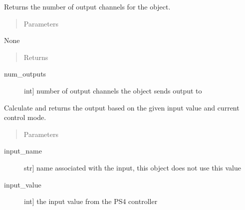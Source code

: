 \documentclass[letterpaper,10pt,english]{sphinxmanual}
\begin{document}
\begin{fulllineitems}
\begin{fulllineitems}
\label{\detokenize{generic:AnalogOutputObject.AnalogOutputObject.get_num_channels}}
\sphinxAtStartPar
Returns the number of output channels for the object.
\begin{quote}\begin{description}
\item[{Parameters}] \leavevmode
\end{description}\end{quote}

\sphinxAtStartPar
None
\begin{quote}\begin{description}
\item[{Returns}] \leavevmode
\end{description}\end{quote}
\begin{description}
\item[{num\_outputs}] \leavevmode{[}int{]}
\sphinxAtStartPar
number of output channels the object sends output to

\end{description}

\end{fulllineitems}


\begin{fulllineitems}
\label{\detokenize{generic:AnalogOutputObject.AnalogOutputObject.get_output}}
\sphinxAtStartPar
Calculate and returns the output based on the given input value and current control mode.
\begin{quote}\begin{description}
\item[{Parameters}] \leavevmode
\end{description}\end{quote}
\begin{description}
\item[{input\_name}] \leavevmode{[}str{]}
\sphinxAtStartPar
name associated with the input, this object does not use this value

\item[{input\_value}] \leavevmode{[}int{]}
\sphinxAtStartPar
the input value from the PS4 controller


\end{description}
\end{fulllineitems}
\end{fulllineitems}
\end{document}
